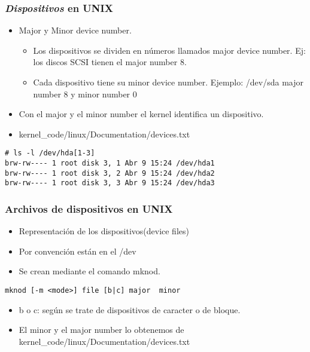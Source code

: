 \begin{frame}[fragile]
\frametitle{\textit{Dispositivos} en UNIX}  
  \begin{itemize}
	\item Major y Minor device number.
	\begin{itemize}
		\item Los dispositivos se dividen en números llamados major device number. Ej: los discos SCSI tienen el major number 8.
		\item Cada dispositivo tiene su minor device number. Ejemplo: /dev/sda major number 8 y minor number 0 
	\end{itemize}	
	\item Con el major y el minor number el kernel identifica un dispositivo.
	\item kernel\_code/linux/Documentation/devices.txt
  \end{itemize}
\begin{lstlisting}
# ls -l /dev/hda[1-3]
brw-rw---- 1 root disk 3, 1 Abr 9 15:24 /dev/hda1
brw-rw---- 1 root disk 3, 2 Abr 9 15:24 /dev/hda2
brw-rw---- 1 root disk 3, 3 Abr 9 15:24 /dev/hda3
\end{lstlisting}
\end{frame}

\begin{frame}[fragile]
\frametitle{Archivos de dispositivos en UNIX}  
  \begin{itemize}
	\item Representación de los dispositivos(device files)
	\item Por convención están en el /dev
	\item Se crean mediante el comando mknod.
  \end{itemize}
\begin{lstlisting}
mknod [-m <mode>] file [b|c] major  minor
\end{lstlisting}
  \begin{itemize}
	\item b o c: según se trate de dispositivos de caracter o de bloque.
	\item El minor y el major number lo obtenemos de kernel\_code/linux/Documentation/devices.txt
  \end{itemize}
\end{frame}

